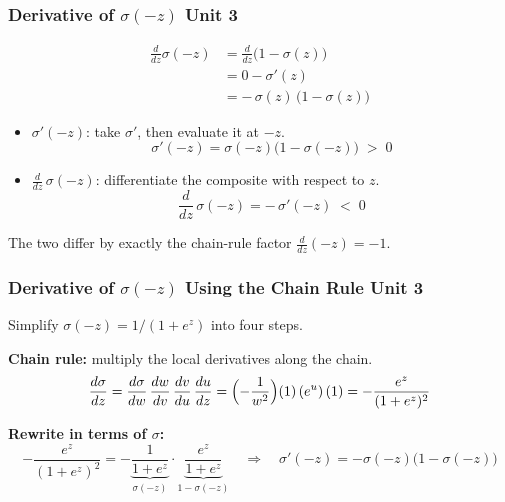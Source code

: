 \documentclass[12pt]{beamer}
\newcommand{\FrameTitle}[2]{\frametitle{#1 \hfill \small\textnormal{\textcolor{midgray}{#2}}}}
\begin{document}
\begin{frame}\FrameTitle{Derivative of $\sigma(-z)$}{Unit 3}
    \vspace*{-1em}
    \begin{align*}
        \frac{d}{dz}\sigma(-z) &= \frac{d}{dz}\bigl(1-\sigma(z)\bigr) \\[1mm]
        &= 0 - \sigma'(z) \\[1mm]
        &= -\,\sigma(z)\,\bigl(1-\sigma(z)\bigr)
    \end{align*}
    \begin{itemize}
        \item $\sigma'(-z)$: take $\sigma'$, then evaluate it at $-z$.
              \[
                  \sigma'(-z) = \sigma(-z)\bigl(1-\sigma(-z)\bigr) \;>\; 0
              \]
        \item $\tfrac{d}{dz}\,\sigma(-z)$: differentiate the composite
              with respect to $z$.
              \[
                  \frac{d}{dz}\,\sigma(-z) = -\,\sigma'(-z) \;<\; 0
              \]
    \end{itemize}
    \medskip
    The two differ by exactly the chain-rule factor $\tfrac{d}{dz}(-z) = -1$.
\end{frame}

\begin{frame}\FrameTitle{Derivative of $\sigma(-z)$ Using the Chain Rule}{Unit 3}
Simplify $\sigma(-z) = 1/(1+e^{z})$ into four steps.
    \begin{center}
    \end{center}

    \textbf{Chain rule:} multiply the local derivatives along the chain.
    \[
        \frac{d\sigma}{dz}
        = \frac{d\sigma}{dw}\,\frac{dw}{dv}\,\frac{dv}{du}\,\frac{du}{dz}
        = \Bigl(-\frac{1}{w^{2}}\Bigr)(1)\,(e^{u})\,(1)
        = -\frac{e^{z}}{(1+e^{z})^{2}}
    \]

    \textbf{Rewrite in terms of $\sigma$:}
    {\small{\[
        -\frac{e^{z}}{(1+e^{z})^{2}}
        = -\underbrace{\frac{1}{1+e^{z}}}_{\sigma(-z)}
          \cdot
          \underbrace{\frac{e^{z}}{1+e^{z}}}_{1-\sigma(-z)}
        \quad\Longrightarrow\quad
        \boxed{\sigma'(-z) = -\sigma(-z)\bigl(1-\sigma(-z)\bigr)}
    \]}}
\end{frame}
\end{document}
